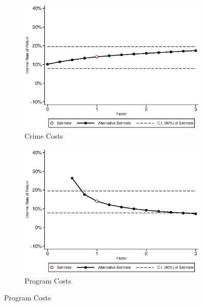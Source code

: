 \begin{figure}[H]
\ContinuedFloat		
	\begin{subfigure}[h]{0.8\textwidth}
	\centering
	\caption{Crime Costs} \label{fig:irrf_crime_m1}
	\includegraphics[width=\textwidth]{AppOutput/Sensitivity/irrf_crime_m1.eps}
	\end{subfigure}
	
	\begin{subfigure}[h]{0.8\textwidth}
	\centering
	\caption{Program Costs} \label{fig:irrf_costs_m1}
	\includegraphics[width=\textwidth]{AppOutput/Sensitivity/irrf_costs_m1.eps}
	\end{subfigure}
\end{figure}
	

